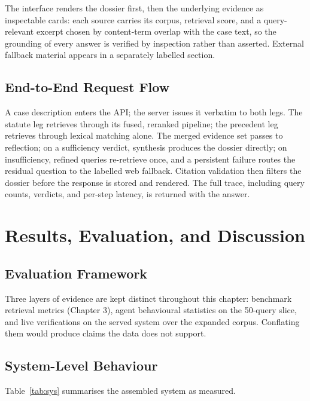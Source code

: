 \documentclass{mnnit}
\begin{document}
The interface renders the dossier first, then the underlying
evidence as inspectable cards: each source carries its corpus,
retrieval score, and a query-relevant excerpt chosen by
content-term overlap with the case text, so the grounding of
every answer is verified by inspection rather than asserted.
External fallback material appears in a separately labelled
section.

\section{End-to-End Request Flow}
A case description enters the API; the server issues it verbatim
to both legs. The statute leg retrieves through its fused,
reranked pipeline; the precedent leg retrieves through lexical
matching alone. The merged evidence set passes to reflection; on
a sufficiency verdict, synthesis produces the dossier directly;
on insufficiency, refined queries re-retrieve once, and a
persistent failure routes the residual question to the labelled
web fallback. Citation validation then filters the dossier before
the response is stored and rendered. The full trace, including
query counts, verdicts, and per-step latency, is returned with
the answer.

\chapter{Results, Evaluation, and Discussion}

\section{Evaluation Framework}
Three layers of evidence are kept distinct throughout this
chapter: benchmark retrieval metrics (Chapter 3), agent
behavioural statistics on the 50-query slice, and live
verifications on the served system over the expanded corpus.
Conflating them would produce claims the data does not support.

\section{System-Level Behaviour}
Table~\ref{tab:sys} summarises the assembled system as measured.
\end{document}
